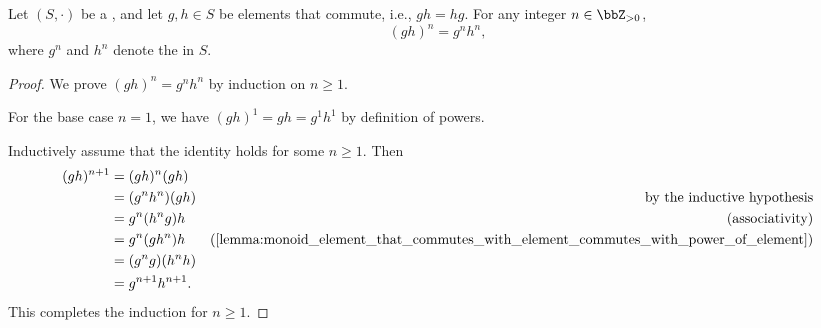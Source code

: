 \begin{lemma} \label{lemma:power_of_product_of_commuting_elements_in_a_semigroup}
    Let $(S,\cdot)$ be a , and let $g, h \in S$ be elements that commute, i.e., $gh = hg$. For any integer $n \in \bbZ_{>0}$,
    $$(gh)^n = g^n h^n,$$
    where $g^n$ and $h^n$ denote the  in $S$.
\end{lemma}

\begin{proof}
    We prove $(gh)^n = g^n h^n$ by induction on $n \ge 1$.

    For the base case $n = 1$, we have $(gh)^1 = gh = g^1 h^1$ by definition of powers.

    Inductively assume that the identity holds for some $n \ge 1$. Then
    \begin{align*}
        (gh)^{n+1} &= (gh)^n (gh) \\
        &= (g^n h^n) (gh) & \text{by the inductive hypothesis} \\
        &= g^n (h^n g) h & \text{(associativity)} \\
        &= g^n (g h^n) h & \text{(\Cref{lemma:monoid_element_that_commutes_with_element_commutes_with_power_of_element})} \\
        &= (g^n g) (h^n h) \\
        &= g^{n+1} h^{n+1}.
    \end{align*}
    This completes the induction for $n \ge 1$.
\end{proof}